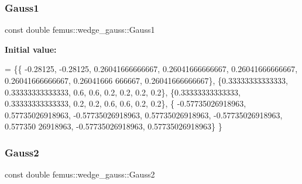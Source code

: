 \subsubsection{\texorpdfstring{Gauss1}{Gauss1}}
{\footnotesize\ttfamily const double femus\+::wedge\+\_\+gauss\+::\+Gauss1\hspace{0.3cm}{\ttfamily [static]}}

{\bfseries Initial value\+:}
\begin{DoxyCode}
= \{\{ -0.28125, -0.28125, 0.26041666666667, 0.26041666666667, 0.26041666666667, 0.26041666666667, 0.26041666
      666667, 0.26041666666667\},
    \{0.33333333333333, 0.33333333333333, 0.6, 0.6, 0.2, 0.2, 0.2, 0.2\},
    \{0.33333333333333, 0.33333333333333, 0.2, 0.2, 0.6, 0.6, 0.2, 0.2\},
    \{ -0.57735026918963, 0.57735026918963, -0.57735026918963, 0.57735026918963, -0.57735026918963, 0.577350
      26918963, -0.57735026918963, 0.57735026918963\}
  \}
\end{DoxyCode}
\mbox{\label{classfemus_1_1wedge__gauss_a933b0be3c70f8720ef2bf30150199769}} 
\subsubsection{\texorpdfstring{Gauss2}{Gauss2}}
{\footnotesize\ttfamily const double femus\+::wedge\+\_\+gauss\+::\+Gauss2\hspace{0.3cm}{\ttfamily [static]}}

